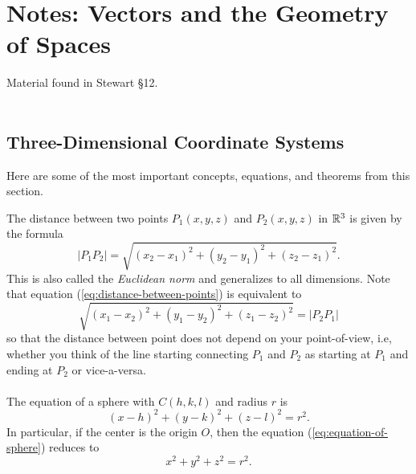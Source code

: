 \chapter{Notes: Vectors and the Geometry of Spaces}
Material found in Stewart \S12.
\\\\
\section{Three-Dimensional Coordinate Systems}
Here are some of the most important concepts, equations, and theorems from
this section.

The distance between two points $P_1(x,y,z)$ and $P_2(x,y,z)$ in $\mathbb{R}^3$
is given by the formula
\begin{equation}
  \label{eq:distance-between-points}
|P_1P_2|=\sqrt{(x_2-x_1)^2+(y_2-y_1)^2+(z_2-z_1)^2}.
\end{equation}
This is also called the \emph{Euclidean norm} and generalizes to all
dimensions. Note that equation (\ref{eq:distance-between-points}) is
equivalent to
\[
\sqrt{(x_1-x_2)^2+(y_1-y_2)^2+(z_1-z_2)^2}=|P_2P_1|
\]
so that the distance between point does not depend on your point-of-view,
i.e, whether you think of the line starting connecting $P_1$ and $P_2$ as
starting at $P_1$ and ending at $P_2$ or vice-a-versa.
\\\\
The equation of a sphere with $C(h,k,l)$ and radius $r$ is
\begin{equation}
  \label{eq:equation-of-a-sphere}
(x-h)^2+(y-k)^2+(z-l)^2=r^2.
\end{equation}
In particular, if the center is the origin $O$, then the equation
(\ref{eq:equation-of-sphere}) reduces to
\[
x^2+y^2+z^2=r^2.
\]

